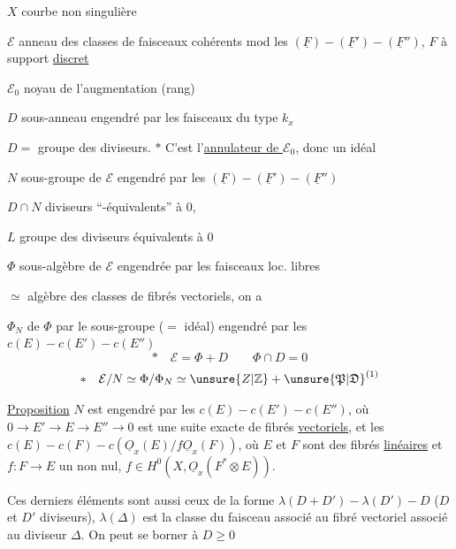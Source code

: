 $X$ courbe non singulière

$\mathcal E$ anneau des classes de faisceaux cohérents mod les
$(\underline F)-(\underline F')-(\underline F'')$, 
 $F$ à support \uline{discret}

$\mathcal E_0$ noyau de l'augmentation (rang)

$D$ sous-anneau engendré par les faisceaux  du type $k_x$

$D=$ groupe des diviseurs. $*$ C'est l'\uline{annulateur de $\mathcal E_0$}, donc un idéal

$N$ sous-groupe de $\mathcal E$ engendré par les
$(\underline F)-(\underline F')-(\underline F'')$

$D\cap N$  diviseurs ``-équivalents'' à $0$,

$L$ groupe des diviseurs équivalents à $0$

$\Phi$ sous-algèbre de $\mathcal E$ engendrée par les  faisceaux loc. libres

$\simeq$ algèbre des classes de fibrés vectoriels, on a

$\Phi_N$  de $\Phi$ par le sous-groupe ($=$ idéal) engendré par les
$c(E)-c(E')-c(E'')$
\[
*\quad \mathcal E=\Phi+D\qquad \Phi\cap D=0
\]
\[
*\quad \mathcal E/N\simeq\Phi/\Phi_N\simeq \unsure{Z|\mathbb Z}+\unsure{\mathfrak P|\mathfrak D}^{(1)}
\]

\uline{Proposition} $N$ est engendré par les $c(E)-c(E')-c(E'')$, où
$0\to E'\to E\to E''\to0$ est une suite exacte de fibrés \uline{vectoriels}, et
les $c(E)-c(F)-c(\underline O_x(E)/f\underline O_x(F))$, où $E$ et $F$ sont des fibrés
\uline{linéaires} et $f:F\to E$ un  non nul,
 $f\in H^0(X,\underline O_x(F^*\otimes E))$.

Ces derniers éléments sont aussi ceux de la forme
$\lambda(D+D')-\lambda(D')-D$ 
($D$ et $D'$ diviseurs),
$\lambda(\Delta)$ est la classe du faisceau associé au fibré vectoriel associé au diviseur $\Delta$.
On peut se borner à $D\geq0$



